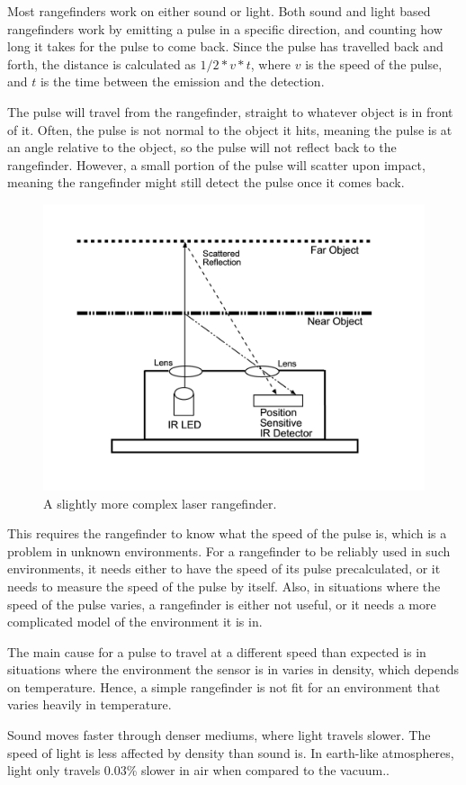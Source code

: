 Most rangefinders work on either sound or light. Both sound and light based rangefinders work by emitting a pulse in a specific direction, and counting how long it takes for the pulse to come back. Since the pulse has travelled back and forth, the distance is calculated as \(1/2*v*t\), where \(v\) is the speed of the pulse, and \(t\) is the time between the emission and the detection.

The pulse will travel from the rangefinder, straight to whatever object is in front of it. Often, the pulse is not normal to the object it hits, meaning the pulse is at an angle relative to the object, so the pulse will not reflect back to the rangefinder. However, a small portion of the pulse will scatter upon impact, meaning the rangefinder might still detect the pulse once it comes back.

\begin{figure}[H]
	\centering
	\includegraphics[width=.4\linewidth]{images/rangefinder.jpg}
        \caption{A slightly more complex laser rangefinder.}
        \label{fig:rangefinderIMG}
\end{figure}

This requires the rangefinder to know what the speed of the pulse is, which is a problem in unknown environments. For a rangefinder to be reliably used in such environments, it needs either to have the speed of its pulse precalculated, or it needs to measure the speed of the pulse by itself. Also, in situations where the speed of the pulse varies, a rangefinder is either not useful, or it needs a more complicated model of the environment it is in.

The main cause for a pulse to travel at a different speed than expected is in situations where the environment the sensor is in varies in density, which depends on temperature\cite{refraction}. Hence, a simple rangefinder is not fit for an environment that varies heavily in temperature.

Sound moves faster through denser mediums, where light travels slower. The speed of light is less affected by density than sound is. In earth-like atmospheres, light only travels 0.03\% slower in air when compared to the vacuum.\cite{refraction}\cite{speedOfSound}.

